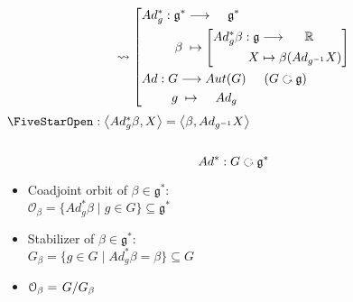 \documentclass[11pt]{amsart}
\numberwithin{equation}{section}
\theoremstyle{plain}
\theoremstyle{plain}
\numberwithin{equation}{section}
\theoremstyle{remark}
\begin{document}
\begin{minipage}[t]{.5\textwidth}
	\begin{equation*}
	\rightsquigarrow \left[
	\begin{lgathered}
	\begin{aligned}
	Ad_g^*:\mathfrak{g}^*&\longrightarrow \hspace{0.4cm} \mathfrak{g}^*\\
	\beta \;&\mapsto \left[
		\begin{aligned}
			Ad_g^* \beta : \mathfrak{g} &\longrightarrow  \hspace{0.5cm} \mathbb{R}\\
			X &\mapsto \beta (Ad_{g^{-1}}X)
		\end{aligned}
	\right]
	\end{aligned}\\
	\begin{aligned}
	Ad:G&\longrightarrow Aut(G)\hspace{0.5cm}(G \text{ \rotatebox[origin=c]{270}{$\circlearrowleft$} } \mathfrak{g})\\
	g &\;\mapsto \hspace{0.4cm} Ad_g
	\end{aligned}
	\end{lgathered} \right. 
	\end{equation*}
		 $\text{\FiveStarOpen} : \left<Ad_g^* \beta, X\right>=\left<\beta, Ad_{g^{-1}}X\right>$
\\
\\
	$$Ad^*: G \text{ \rotatebox[origin=c]{270}{$\circlearrowleft$} } \mathfrak{g}^*$$
	\begin{itemize}
		\item Coadjoint orbit of $\beta \in \mathfrak{g}^*:$\\
		$\mathcal{O}_{\beta}=\{Ad_g^* \beta \mid g \in G\} \subseteq \mathfrak{g}^*$
		\item Stabilizer of $\beta \in \mathfrak{g}^*:$\\
		$G_{\beta}=\{g \in G \mid Ad_g^* \beta = \beta\} \subseteq G$
		\item $\mathcal{O}_{\beta}= \left.G \middle/ G_{\beta}\right.$
	\end{itemize}

	
	
\end{minipage}
\end{document}
